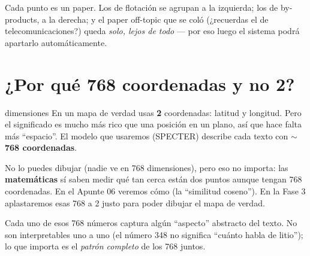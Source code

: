 \documentclass[11pt,a4paper]{article}
\begin{document}
\begin{center}
\end{center}

Cada punto es un paper. Los de flotación se agrupan a la izquierda; los de by-products, a
la derecha; y el paper off-topic que se coló (¿recuerdas el de telecomunicaciones?) queda
\emph{solo, lejos de todo} --- por eso luego el sistema podrá apartarlo automáticamente.

\section{¿Por qué 768 coordenadas y no 2?}

\begin{concepto}{dimensiones}
En un mapa de verdad usas \textbf{2} coordenadas: latitud y longitud. Pero el significado
es mucho más rico que una posición en un plano, así que hace falta más ``espacio''. El
modelo que usaremos (SPECTER) describe cada texto con \textbf{$\sim$768 coordenadas}.

No lo puedes dibujar (nadie ve en 768 dimensiones), pero eso no importa: las
\textbf{matemáticas} sí saben medir qué tan cerca están dos puntos aunque tengan 768
coordenadas. En el Apunte 06 veremos cómo (la ``similitud coseno''). En la Fase 3
aplastaremos esas 768 a 2 justo para poder dibujar el mapa de verdad.
\end{concepto}

Cada uno de esos 768 números captura algún ``aspecto'' abstracto del texto. No son
interpretables uno a uno (el número 348 no significa ``cuánto habla de litio''); lo que
importa es el \emph{patrón completo} de los 768 juntos.
\end{document}
